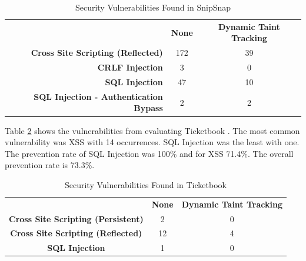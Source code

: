\begin{table}[!hbt]
  \centering
  \caption{Security Vulnerabilities Found in SnipSnap}
  \label{table:SnipSnapTable}
  \begin{tabular}{rcc}
    & \textbf{None} & \textbf{Dynamic Taint Tracking} \\
    \textbf{Cross Site Scripting (Reflected)}      & 172           & 39   \\
    \textbf{CRLF Injection}                        & 3             & 0    \\
    \textbf{SQL Injection}                         & 47            & 10   \\
    \textbf{SQL Injection - Authentication Bypass} & 2             & 2       
  \end{tabular}
\end{table}

Table \ref{table:Ticketbook} shows the vulnerabilities from evaluating Ticketbook \parencite{ticketbook}. The most common vulnerability was XSS with 14 occurrences. SQL Injection was the least with one. The prevention rate of SQL Injection was 100\% and for XSS 71.4\%. The overall prevention rate is 73.3\%.

\begin{table}[!hbt]
  \centering
  \caption{Security Vulnerabilities Found in Ticketbook}
  \label{table:Ticketbook}
  \begin{tabular}{ccc}
    & \textbf{None} & \textbf{Dynamic Taint Tracking} \\
    \textbf{Cross Site Scripting (Persistent)} & 2             & 0 \\
    \textbf{Cross Site Scripting (Reflected)}  & 12            & 4 \\
    \textbf{SQL Injection}                     & 1             & 0
  \end{tabular}
\end{table}